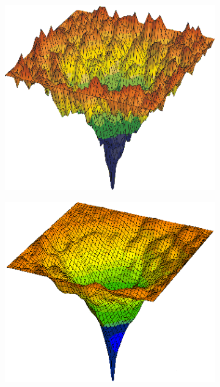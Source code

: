 \begin{figure}[h]
\centering
\begin{subfigure}[b]{0.3\textwidth}
    \centering
    \includegraphics[width=\textwidth]{figures/drysurf.png}
    \label{fig:dry}
    \caption{}
\end{subfigure}%
\hspace{0.1\textwidth}
\begin{subfigure}[b]{0.3\textwidth}
    \centering
    \includegraphics[width=\textwidth]{figures/wetsurf.png}

\end{subfigure}
\end{figure}
